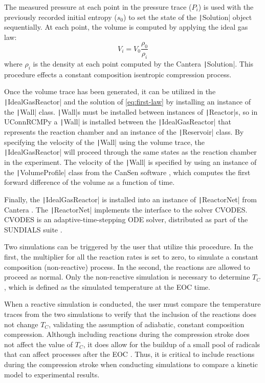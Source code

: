 \documentclass[12pt]{../ussci}
\begin{document}
The measured pressure at each point in the pressure trace (\(P_i\)) is
used with the previously recorded initial entropy (\(s_0\)) to set the
state of the \texttt|Solution| object sequentially. At each point, the
volume is computed by applying the ideal gas law:
%
\begin{equation}
 V_i = V_0 \frac{\rho_0}{\rho_i}
\end{equation}
%
where \(\rho_i\) is the density at each point computed by the Cantera
\texttt|Solution|. This procedure effects a constant composition
isentropic compression process.

Once the volume trace has been generated, it can be utilized in the
\texttt|IdealGasReactor| and the solution of \cref{eq:first-law} by installing an instance of the
\texttt|Wall| class. \texttt|Wall|s must be installed between instances
of \texttt|Reactor|s, so in UConnRCMPy a \texttt|Wall| is installed
between the \texttt|IdealGasReactor| that represents the reaction
chamber and an instance of the \texttt|Reservoir| class. By specifying
the velocity of the \texttt|Wall| using the volume trace, the
\texttt|IdealGasReactor| will proceed through the same states as the
reaction chamber in the experiment. The velocity of the \texttt|Wall| is
specified by using an instance of the \texttt|VolumeProfile| class from
the CanSen software \autocite{cansen}, which computes the first forward
difference of the volume as a function of time.

Finally, the \texttt|IdealGasReactor| is installed into an instance of
\texttt|ReactorNet| from Cantera \autocite{cantera}. The
\texttt|ReactorNet| implements the interface to the solver CVODES.
CVODES is an adaptive-time-stepping ODE solver, distributed as part of the
SUNDIALS suite \autocite{Hindmarsh2005}.

Two simulations can be triggered by the user that utilize this
procedure. In the first, the multiplier for all the reaction rates is
set to zero, to simulate a constant composition (non-reactive) process.
In the second, the reactions are allowed to proceed as normal. Only the
non-reactive simulation is necessary to determine \(T_C\), which is
defined as the simulated temperature at the EOC time.

When a reactive simulation is conducted, the user must compare the
temperature traces from the two simulations to verify that the inclusion
of the reactions does not change \(T_C\), validating the assumption of
adiabatic, constant composition compression. Although including
reactions during the compression stroke does not affect the value of
\(T_C\), it does allow for the buildup of a small pool of radicals that
can affect processes after the EOC \autocite{Mittal2008}. Thus, it is
critical to include reactions during the compression stroke when
conducting simulations to compare a kinetic model to experimental
results.
\end{document}
